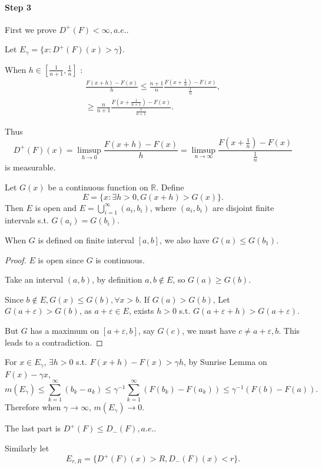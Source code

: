 \paragraph{Step 3}
First we prove $D^+(F)<\infty, a.e.$.

Let $E_\gamma = \{x: D^+(F)(x)>\gamma\}$.

When $h\in [\frac{1}{n+1}, \frac{1}{n}]$ :
\begin{align*}
	\frac{F(x+h) - F(x)}{h}\le \frac{n+1}{n} \frac{F(x+\frac{1}{n})-F(x)}{\frac{1}{n}},\\
	\ge \frac{n}{n+1}\frac{F(x+\frac{1}{n+1})-F(x)}{\frac{1}{n+1}}.
\end{align*}

Thus
\[
D^+(F)(x) = \limsup_{h\to 0}\frac{F(x+h)-F(x)}{h}
=\limsup_{n\to \infty} \frac{F(x+\frac{1}{n})-F(x)}{\frac{1}{n}}
\]
is measurable.

\begin{lemma}
	Let $G(x)$ be a continuous function on $\mathbb{R}$. Define
	\[
	E = \{x: \exists h>0, G(x+h)>G(x)\}.
	\]
	Then $E$ is open and $E = \bigcup_{i=1}^\infty (a_i, b_i)$,
	where $(a_i,b_i)$ are disjoint finite intervals s.t. $G(a_i) = G(b_i)$.

	When $G$ is defined on finite interval $[a,b]$, we also have $G(a)\le G(b_1)$.
\end{lemma}
\begin{proof}[Proof]
    $E$ is open since $G$ is continuous.

	Take an interval $(a,b)$, by definition $a,b\notin E$, so $G(a)\ge G(b)$.

	Since $b\notin E, G(x)\le G(b), \forall x>b$.
	If $G(a)>G(b)$,
	Let  $G(a+\varepsilon) > G(b)$, as $a+\varepsilon\in E$,
	exists $h>0$ s.t. $G(a+\varepsilon+h)>G(a+\varepsilon)$.

	But $G$ has a maximum on $[a+\varepsilon, b]$, say $G(c)$,
	we must have $c\ne a+\varepsilon, b$.
	This leads to a contradiction.
\end{proof}

For $x\in E_\gamma$,  $\exists h>0$ s.t. $F(x+h)-F(x) > \gamma h$,
by Sunrise Lemma on  $F(x)-\gamma x$,
\[
	m(E_\gamma) \le \sum_{k=1}^{\infty} (b_k - a_k)
	\le \gamma^{-1}\sum_{k=1}^{\infty} (F(b_k)-F(a_k))\le \gamma^{-1}(F(b)-F(a)).
\]
Therefore when $\gamma\to \infty$, $m(E_\gamma)\to 0$.

The last part is $D^+(F)\le D_-(F),a.e.$.

Similarly let
 \[
E_{r, R} = \{D^+(F)(x)>R, D_-(F)(x)<r\}.
\]

